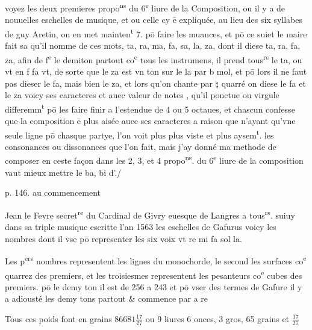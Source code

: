 \documentclass[11pt,a4paper]{article}
\begin{document}
voyez les deux premieres propo\textsuperscript{ns} du 6\textsuperscript{e} liure de la Composition, ou il y a de nouuelles eschelles de musique, et ou celle cy ē expliquée, au lieu des six syllabes de guy Aretin, on en met mainten\textsuperscript{t} 7. pō faire les muances, et pō ce suiet le maire fait sa  qu'il nomme de ces mots, ta, ra, ma, fa, sa, la, za, dont il diese ta, ra, fa, za, afin de f\textsuperscript{e} le demiton partout co\textsuperscript{e} tous les instrumens, il prend tous\textsuperscript{rs} le ta, ou vt en f fa vt, de sorte que le za est vn ton sur le la par b mol, et pō lors il ne faut pas dieser le fa, mais bien le za, et lors qu'on chante par $\natural$ quarré on diese le fa et le za voicy ses caracteres \ill{} et auec valeur de notes \ill{}, qu'il ponctue ou virgule differemm\textsuperscript{t} pō les faire finir a l'estendue de 4 ou 5 octaues, et chascun confesse que la composition ē plus aisée auec ses caracteres a raison que n'ayant qu'vne seule ligne pō chasque partye, l'on voit plus plus viste et plus aysem\textsuperscript{t}. les consonances ou dissonances que l'on fait, mais j'ay donné ma methode de composer en ceste façon dans les 2, 3, et 4 propo\textsuperscript{ns}. du 6\textsuperscript{e} liure de la composition   vaut mieux mettre le ba, bi d'./

p. 146. au commencement

 Jean le Fevre secret\textsuperscript{re} du Cardinal de Givry euesque de Langres a tous\textsuperscript{rs}. suiuy dans sa triple musique escritte l'an 1563 les eschelles de Gafurus voicy les nombres dont il vse pō representer les six voix vt re mi fa sol la.

 Les p\textsuperscript{ers} nombres representent les lignes du monochorde, le second les surfaces co\textsuperscript{e} quarrez des premiers, et les troisiesmes representent les pesanteurs co\textsuperscript{e} cubes des premiers. pō le demy ton il est de 256 a 243 et pō vser des termes de Gafure il y a adiousté les demy tons partout \& commence par a re

\marginal{\ill{}} Tous ces poids font en grains $86681\frac{17}{27}$ ou 9 liures 6 onces, 3 gros, 65 grains et $\frac{17}{27}$
\end{document}
